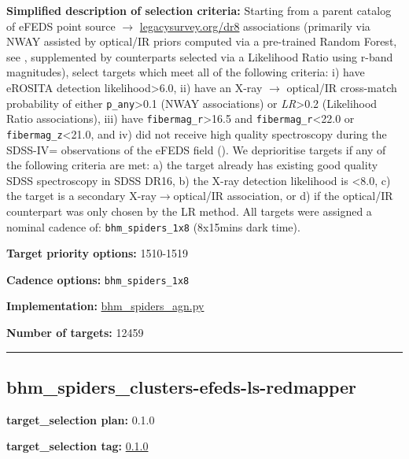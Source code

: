 \noindent\textbf{Simplified description of selection criteria:} Starting from a
parent catalog of eFEDS point source $\rightarrow$
\href{https://www.legacysurvey.org/dr8}{legacysurvey.org/dr8}
associations (primarily via NWAY assisted by optical/IR priors computed
via a pre-trained Random Forest, see
\citealt{Salvato2022}, supplemented by counterparts selected via a Likelihood
Ratio using r-band magnitudes), select targets which meet all of the
following criteria: i) have eROSITA detection likelihood\textgreater6.0,
ii) have an X-ray $\rightarrow$ optical/IR cross-match probability of either
\texttt{p\_any}\textgreater0.1 (NWAY associations) or
\emph{LR}\textgreater0.2 (Likelihood Ratio associations), iii) have
\texttt{fibermag\_r}\textgreater16.5 and
\texttt{fibermag\_r}\textless22.0 or \texttt{fibermag\_z}\textless21.0,
and iv) did not receive high quality spectroscopy during the SDSS-IV=
observations of the eFEDS field
(\citealt{Abdurrouf_2021_sdssDR17}). We deprioritise targets if any of the following criteria
are met: a) the target already has existing good quality SDSS
spectroscopy in SDSS DR16, b) the X-ray detection likelihood is
\textless8.0, c) the target is a secondary X-ray$\rightarrow$optical/IR association,
or d) if the optical/IR counterpart was only chosen by the LR method.
All targets were assigned a nominal cadence of:
\texttt{bhm\_spiders\_1x8} (8x15mins dark time).


\noindent\textbf{Target priority options:} 1510-1519

\noindent\textbf{Cadence options:} \texttt{bhm\_spiders\_1x8}

\noindent\textbf{Implementation:}
\href{https://github.com/sdss/target_selection/blob/0.1.0/python/target_selection/cartons/bhm_spiders_agn.py}{bhm\_spiders\_agn.py}

\noindent\textbf{Number of targets:} 12459

\begin{center}\rule{0.5\linewidth}{0.5pt}\end{center}

\hypertarget{bhm_spiders_clusters-efeds-ls-redmapper_plan0.1.0}{%
\subsection{bhm\_spiders\_clusters-efeds-ls-redmapper}\label{bhm_spiders_clusters-efeds-ls-redmapper_plan0.1.0}}

\noindent\textbf{target\_selection plan:} 0.1.0

\noindent\textbf{target\_selection tag:}
\href{https://github.com/sdss/target_selection/tree/0.1.0/}{0.1.0}


